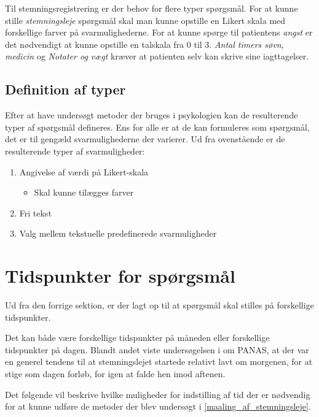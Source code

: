 Til stemningsregistrering er der behov for flere typer spørgsmål.
For at kunne stille \emph{stemningsleje} spørgsmål skal man kunne opstille en Likert skala med forskellige farver på svarmulighederne.
For at kunne spørge til patientens \emph{angst} er det nødvendigt at kunne opstille en talskala fra 0 til 3.
\emph{Antal timers søvn}, \emph{medicin} og \emph{Notater og vægt} kræver at patienten selv kan skrive sine iagttagelser.

\subsection{Definition af typer}\label{krav::typer}
Efter at have undersøgt metoder der bruges i psykologien kan de resulterende typer af spørgsmål defineres.
Ens for alle er at de kan formuleres som spørgsmål, det er til gengæld svarmulighederne der varierer.
Ud fra ovenstående er de resulterende typer af svarmuligheder:

\begin{enumerate}
\item Angivelse af værdi på Likert-skala
\begin{itemize}
\item Skal kunne tilægges farver
\end{itemize}
\item Fri tekst
\item Valg mellem tekstuelle predefinerede svarmuligheder
\end{enumerate}

\section{Tidspunkter for spørgsmål}\label{tidspnkforspg}
Ud fra den forrige sektion, er der lagt op til at spørgsmål skal stilles på forskellige tidspunkter.

Det kan både være forskellige tidspunkter på måneden eller forskellige tidspunkter på dagen.
Blandt andet viste undersøgelsen i \citet{panas} om PANAS, at der var en generel tendens til at stemningslejet startede relativt lavt om morgenen, for at stige som dagen forløb, for igen at falde hen imod aftenen.

Det følgende vil beskrive hvilke muligheder for indstilling af tid der er nødvendig for at kunne udføre de metoder der blev undersøgt i \cref{maaling_af_stemningsleje}.

